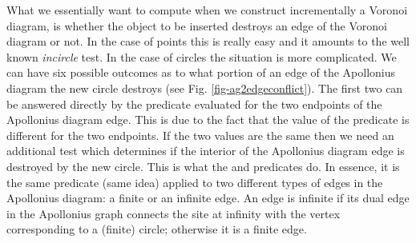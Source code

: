 What we essentially want to compute when we construct incrementally a
Voronoi diagram, is whether the object to be inserted destroys an edge
of the Voronoi diagram or not. In the case of points this is really
easy and it amounts to the well known {\em incircle} test. 
In the case
of circles the situation is more complicated. We can have six possible
outcomes as to what portion of an edge of the Apollonius diagram the
new circle destroys (see Fig. \ref{fig-ag2edgeconflict}). The first
two can be answered directly by the  predicate
evaluated for the two endpoints of the Apollonius diagram edge. This
is due to the fact that the value of the 
predicate is different for the two endpoints. If the two values are
the same then we need an additional test which determines if the interior
of the Apollonius diagram edge is destroyed by the new circle. This is
what the  and
 predicates do. In essence, it
is the same predicate (same idea) applied to two different types of
edges in the Apollonius diagram: a finite or an infinite edge. An edge
is infinite if its dual edge in the Apollonius graph connects the
site at infinity with the vertex corresponding to a (finite) circle; 
otherwise it is a finite edge.

